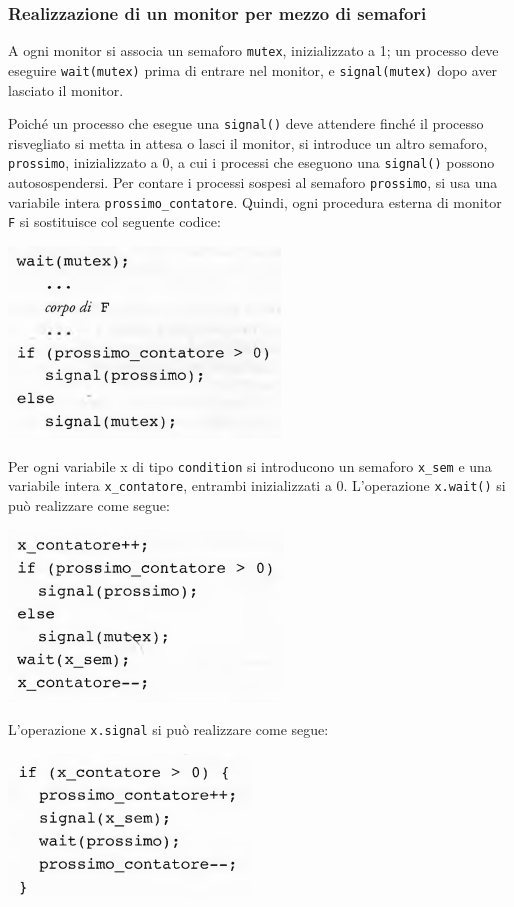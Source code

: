 \documentclass[11pt,a4paper]{article}
\begin{document}
\subsubsection{Realizzazione di un monitor per mezzo di semafori}
A ogni monitor si associa un semaforo \texttt{mutex}, inizializzato a 1; un processo deve
eseguire \texttt{wait(mutex)} prima di entrare nel monitor, e \texttt{signal(mutex)} dopo aver lascia­to il monitor.

Poiché un processo che esegue una \texttt{signal()} deve attendere finché il processo risve­gliato si metta in attesa o lasci il monitor, si introduce un altro semaforo, \texttt{prossimo}, ini­zializzato a 0, a cui i processi che eseguono una \texttt{signal()} possono autosospendersi. Per
contare i processi sospesi al semaforo \texttt{prossimo}, si usa una variabile intera
\texttt{prossimo\_contatore}. Quindi, ogni procedura esterna di monitor \texttt{F} si sostituisce col se­guente codice:
\begin{center}
  \includegraphics[scale=0.6]{img/0033.png}
\end{center}
Per ogni
variabile x di tipo \texttt{condition} si introducono un semaforo \texttt{x\_sem} e una variabile intera
\texttt{x\_contatore}, entrambi inizializzati a 0. L'operazione \texttt{x.wait()} si può realizzare come
segue:
\begin{center}
  \includegraphics[scale=0.6]{img/0034.png}
\end{center}
L'operazione \texttt{x.signal} si può realizzare come segue:
\begin{center}
  \includegraphics[scale=0.6]{img/0035.png}
\end{center}
\end{document}

